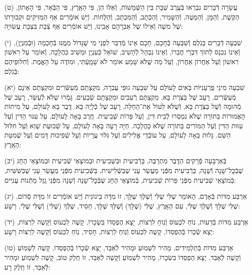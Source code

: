 \documentclass[twoside, openany, parskip=half, 11pt]{book}
\begin{document}
(ט)
עֲשָׂרָה דְֿבָרִים נִבְרְאוּ בְּֿעֶֽרֶב שַׁבָּת בֵּין הַשְּֿׁמָשׁוֹת, וְֿאֵלּו הֵן, פִּי הָאָֽרֶץ, פִּי הַבְּֿאֵר, פִּי הָאָתוֹן, הַקֶּשֶׁת, וְֿהַמָּן, וְֿהַמַּטֶּה, וְֿהַשָּׁמִיר, וְֿהַכְּֿתָב, וְֿהַמִּכְתָּב, וְֿהַלֻּחוֹת. וְֿיֵשׁ אוֹמְֿרִים אַף הַמַּזִּיקִים וּקְבוּרָתוֹ שֶׁל משֶׁה וְֿאֵילוֹ שֶׁל אַבְרָהָם אָבִֽינוּ, וְֿיֵשׁ אוֹמְֿרִים אַף צְֿבַת בִּצְבַת עֲשׂוּיָה:

(י) שִׁבְעָה דְֿבָרִים בַּגֹֽלֶם וְֿשִׁבְעָה בְּֿחָכָם, חָכָם אֵינוֹ מְֿדַבֵּר לִפְנֵי מִי שֶׁגָּדוֹל מִמֶּֽנּוּ בְּֿחׇכְמָה (וּבְֿמִנְיָן), וְֿאֵינוֹ נִכְנָס לְֿתוֹךְ דִּבְרֵי חֲבֵרוֹ, וְֿאֵינוֹ נִבְהָל לְֿהָשִׁיב, שׁוֹאֵל כְּֿעִנְיָן וּמֵשִׁיב כַּהֲלָכָה, וְֿאוֹמֵר עַל רִאשׁוֹן רִאשׁוֹן וְֿעַל אַחֲרוֹן אַחֲרוֹן, וְֿעַל מַה שֶׁלֹּא שָׁמַע אוֹמֵר לֹא שָׁמָֽעְֿתִּי, וּמוֹדֶה עַל הָאֱמֶת. וְֿחִלּוּפֵיהֶם בְּֿגֹֽלֶם:

(יא)
שִׁבְעָה מִינֵי פֻרְעָנִיּוֹת בָּאִים לָעוֹלָם עַל שִׁבְעָה גוּפֵי עֲבֵרָה, מִקְצָתָם מְֿעַשְּֿׂרִים וּמִקְצָתָם אֵינָם מְֿעַשְּֿׂרִים, רָעָב שֶׁל בַּצֹּֽרֶת בָּא, מִקְצָתָם רְֿעֵבִים וּמִקְצָתָם שְֿׂבֵעִים. גָּמְֿרוּ שֶׁלֹּא לְֿעַשֵּׂר, רָעָב שֶׁל מְֿהוּמָה וְֿשֶׁל בַּצֹּֽרֶת בָּא, וְֿשֶׁלֹּא לִטּוֹל אֶת־הַחַלָּה, רָעָב שֶׁל כְּֿלָיָה בָּא. דֶּֽבֶר בָּא לָעוֹלָם, עַל מִיתוֹת הָאֲמוּרוֹת בַּתּוֹרָה שֶׁלֹּא נִמְסְרוּ לְֿבֵית דִּין, וְֿעַל פֵּרוֹת שְֿׁבִיעִית. חֶֽרֶב בָּאָה לָעוֹלָם, עַל עִנּוּי הַדִּין וְֿעַל עִוּוּת הַדִּין וְֿעַל הַמּוֹרִים בַּתּוֹרָה שֶׁלֹּא כַהֲלָכָה. חַיָּה רָעָה בָּאָה לָעוֹלָם, עַל שְֿׁבוּעַת שָׁוְא וְֿעַל חִלּוּל הַשֵּׁם. גָּלוּת בָּאָה לָעוֹלָם, עַל עוֹבְֿדֵי אֱלִילִים וְֿעַל גִּלּוּי עֲרָיוֹת וְֿעַל שְֿׁפִיכוּת דָּמִים וְֿעַל שְֿׁמִטַּת הָאָֽרֶץ:

(יב)
בְּֿאַרְבָּעָה פְֿרָקִים הַדֶּֽבֶר מִתְרַבֶּה, בָּרְֿבִיעִית וּבַשְׁבִיעִית וּבְמוֹצָאֵי שְֿׁבִיעִית וּבְמוֹצָאֵי הֶחָג שֶׁבְּֿכׇל־שָׁנָה וְֿשָׁנָה, בָּרְֿבִיעִית מִפְּֿנֵי מַעֲשַׂר עָנִי שֶׁבַּשְּֿׁלִישִׁית, בַּשְּֿׁבִיעִית מִפְּֿנֵי מַעֲשַׂר עָנִי שֶׁבַּשִּׁשִּׁית, בְּֿמוֹצָאֵי שְֿׁבִיעִית מִפְּֿנֵי פֵּרוֹת שְֿׁבִיעִית, בְּֿמוֹצָאֵי הֶחָג שֶׁבְּֿכׇל־שָׁנָה וְֿשָׁנָה מִפְּֿנֵי גֵֽזֶל מַתְּֿנוֹת עֲנִיִּים:

(יג)
אַרְבַּע מִדּוֹת בְּֿאָדָם, הָאוֹמֵר שֶׁלִּי שֶׁלִּי וְֿשֶׁלְּךָ שֶׁלָּךְ, זוֹ מִדָּה בֵינוֹנִית וְֿיֵשׁ אוֹמְֿרִים זוֹ מִדַּת סְֿדוֹם, שֶׁלִּי שֶׁלָּךְ וְֿשֶׁלְּךָ שֶׁלִּי, עַם הָאָֽרֶץ, שֶׁלִּי (שֶׁלָּךְ) וְֿשֶׁלְּךָ שֶׁלָּךְ, חָסִיד, שֶׁלְּֿךָ (שֶׁלִּי) וְֿשֶׁלִּי שֶׁלִּי, רָשָׁע:

(יד)
אַרְבַּע מִדּוֹת בְּֿדֵעוֹת, נֽוֹחַ לִכְעוֹס וְֿנֽוֹחַ לִרְצוֹת, יָצָא הֶפְסֵדוֹ בִּשְׂכָרוֹ, קָשֶׁה לִכְעוֹס וְֿקָשֶׁה לִרְצוֹת, יָצָא שְֿׂכָרוֹ בְּֿהֶפְסֵדוֹ, קָשֶׁה לִכְעוֹס וְֿנֽוֹחַ לִרְצוֹת, חָסִיד, נֽוֹחַ לִכְעוֹס וְֿקָשֶׁה לִרְצוֹת רָשָׁע:

(טו)
אַרְבַּע מִדּוֹת בְּֿתַלְמִידִים, מָהִיר לִשְׁמֽוֹעַ וּמָהִיר לְֿאַבֵּד, יָצָא שְֿׂכָרוֹ בְּֿהֶפְסֵדוֹ, קָשֶׁה לִשְׁמֽוֹעַ וְֿקָשֶׁה לְֿאַבֵּד, יָצָא הֶפְסֵדוֹ בִּשְׂכָרוֹ, מָהִיר לִשְׁמֽוֹעַ וְֿקָשֶׁה לְֿאַבֵּד, זוֹ חֵֽלֶק טוֹב, קָשֶׁה לִשְׁמֽוֹעַ וּמָהִיר לְֿאַבֵּד, זוֹ חֵֽלֶק רָע:
\end{document}
